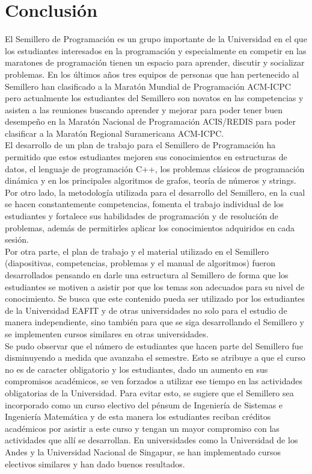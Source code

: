 \documentclass[conference]{IEEEtran}
\begin{document}
\section{Conclusión}
El Semillero de Programación es un grupo importante de la Universidad en el que los estudiantes interesados en la programación y especialmente en competir en las maratones de programación tienen un espacio para aprender, discutir y socializar problemas. En los últimos años tres equipos de personas que han pertenecido al Semillero han clasificado a la Maratón Mundial de Programación ACM-ICPC pero actualmente los estudiantes del Semillero son novatos en las competencias y asisten a las reuniones buscando aprender y mejorar para poder tener buen desempeño en la Maratón Nacional de Programación ACIS/REDIS para poder clasificar a la Maratón Regional Suramericana ACM-ICPC.\\
El desarrollo de un plan de trabajo para el Semillero de Programación ha permitido que estos estudiantes mejoren sus conocimientos en estructuras de datos, el lenguaje de programación C++, los problemas clásicos de programación dinámica y en los principales algoritmos de grafos, teoría de números y strings. Por otro lado, la metodología utilizada para el desarrollo del Semillero, en la cual se hacen constantemente competencias, fomenta el trabajo individual de los estudiantes y fortalece sus habilidades de programación y de resolución de problemas, además de permitirles aplicar los conocimientos adquiridos en cada sesión.\\
Por otra parte, el plan de trabajo y el material utilizado en el Semillero (diapositivas, competencias, problemas y el manual de algoritmos) fueron desarrollados pensando en darle una estructura al Semillero de forma que los estudiantes se motiven a asistir por que los temas son adecuados para su nivel de conocimiento. Se busca que este contenido pueda ser utilizado por los estudiantes de la Universidad EAFIT y de otras universidades no solo para el estudio de manera independiente, sino también para que se siga desarrollando el Semillero y se implementen cursos similares en otras universidades.\\
Se pudo observar que el número de estudiantes que hacen parte del Semillero fue disminuyendo a medida que avanzaba el semestre. Esto se atribuye a que el curso no es de caracter obligatorio y los estudiantes, dado un aumento en sus compromisos académicos, se ven forzados a utilizar ese tiempo en las actividades obligatorias de la Universidad. Para evitar esto, se sugiere que el Semillero sea incorporado como un curso electivo del pénsum de Ingeniería de Sistemas e Ingeniería Matemática y de esta manera los estudiantes reciban créditos académicos por asistir a este curso y tengan un mayor compromiso con las actividades que allí se desarrollan. En universidades como la Universidad de los Andes y la Universidad Nacional de Singapur, se han implementado cursos electivos similares y han dado buenos resultados.\\
\end{document}
